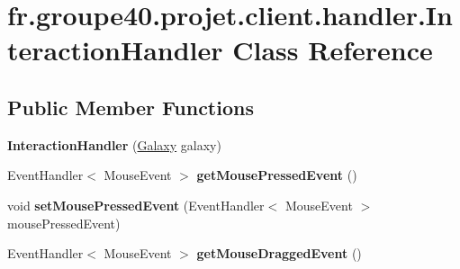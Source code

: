 \hypertarget{classfr_1_1groupe40_1_1projet_1_1client_1_1handler_1_1_interaction_handler}{}\section{fr.\+groupe40.\+projet.\+client.\+handler.\+Interaction\+Handler Class Reference}
\label{classfr_1_1groupe40_1_1projet_1_1client_1_1handler_1_1_interaction_handler}
\subsection*{Public Member Functions}
\begin{DoxyCompactItemize}
\item 
\mbox{\label{classfr_1_1groupe40_1_1projet_1_1client_1_1handler_1_1_interaction_handler_a8dd863e883515616cc850b0bfdf739d6}} 
{\bfseries Interaction\+Handler} (\mbox{\hyperlink{classfr_1_1groupe40_1_1projet_1_1model_1_1board_1_1_galaxy}{Galaxy}} galaxy)
\item 
\mbox{\label{classfr_1_1groupe40_1_1projet_1_1client_1_1handler_1_1_interaction_handler_a5c28d18fd9bcfa863f40fcace497f9f3}} 
Event\+Handler$<$ Mouse\+Event $>$ {\bfseries get\+Mouse\+Pressed\+Event} ()
\item 
\mbox{\label{classfr_1_1groupe40_1_1projet_1_1client_1_1handler_1_1_interaction_handler_ac57c4caa8e5e43adbc4e4eec4985bb1e}} 
void {\bfseries set\+Mouse\+Pressed\+Event} (Event\+Handler$<$ Mouse\+Event $>$ mouse\+Pressed\+Event)
\item 
\mbox{\label{classfr_1_1groupe40_1_1projet_1_1client_1_1handler_1_1_interaction_handler_a06995a2ecf5e028168a3f6609b6f7474}} 
Event\+Handler$<$ Mouse\+Event $>$ {\bfseries get\+Mouse\+Dragged\+Event} ()
\item 
\mbox{\label{classfr_1_1groupe40_1_1projet_1_1client_1_1handler_1_1_interaction_handler_ab79eaad9e04d563e63eda350e8a29fb2}} 

\end{DoxyCompactItemize}
